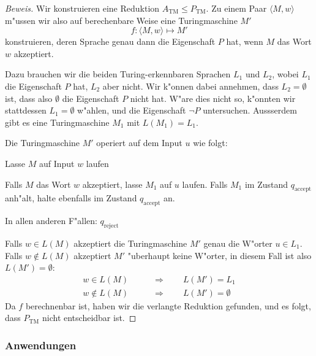 \begin{proof}[Beweis]
Wir konstruieren eine Reduktion $A_\text{TM}\le P_{\text{TM}}$.
Zu einem Paar
$\langle M,w\rangle$
m"ussen wir also auf
berechenbare Weise eine Turingmaschine $M'$
\[
f\colon \langle M,w\rangle\mapsto M'
\]
konstruieren, deren Sprache genau dann die Eigenschaft $P$
hat, wenn $M$ das Wort $w$ akzeptiert.

Dazu brauchen wir die beiden Turing-erkennbaren Sprachen $L_1$ und $L_2$,
wobei $L_1$ die Eigenschaft $P$ hat, $L_2$ aber nicht.
Wir k"onnen dabei annehmen, dass $L_2=\emptyset$ ist, dass also
$\emptyset$ die Eigenschaft $P$ nicht hat.
W"are dies nicht so, k"onnten
wir stattdessen $L_1=\emptyset$  w"ahlen, und die Eigenschaft $\neg P$
untersuchen.
Aussserdem gibt es eine Turingmaschine $M_1$ mit $L(M_1)=L_1$.

Die Turingmaschine $M'$ operiert auf dem Input $u$ wie folgt:
\medskip
\begin{compactenum}
\item Lasse $M$ auf Input $w$ laufen
\item Falls $M$ das Wort $w$ akzeptiert, lasse $M_1$ auf $u$ laufen.
Falls $M_1$ im Zustand $q_{\text{accept}}$ anh"alt, halte ebenfalls
im Zustand $q_{\text{accept}}$ an.
\item In allen anderen F"allen: $q_{\text{reject}}$
\end{compactenum}
\medskip

Falls $w\in L(M)$ akzeptiert die Turingmaschine $M'$ genau die W"orter
$u\in L_1$.
Falls $w\not\in L(M)$ akzeptiert $M'$ "uberhaupt keine
W"orter, in diesem Fall ist also $L(M')=\emptyset$:
\begin{align*}
w\in L(M)&\qquad \Rightarrow\qquad L(M')=L_1\\
w\not\in L(M)&\qquad \Rightarrow\qquad L(M')=\emptyset
\end{align*}
Da $f$ berechnenbar ist, haben wir die verlangte Reduktion
gefunden, und es folgt, dass $P_{\text{TM}}$ nicht
entscheidbar ist.
\end{proof}

\subsubsection{Anwendungen}

